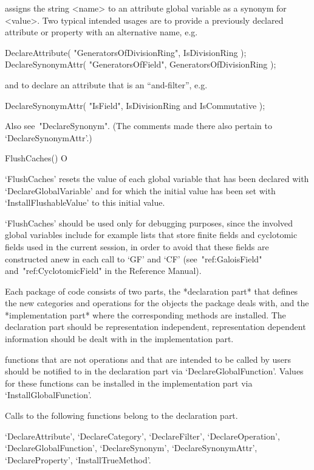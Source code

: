 assigns the string <name> to an attribute global variable as a synonym for
<value>.  Two typical intended usages are to provide a previously declared
attribute or property with an alternative name, e.g.

\begintt
DeclareAttribute( "GeneratorsOfDivisionRing", IsDivisionRing );
DeclareSynonymAttr( "GeneratorsOfField", GeneratorsOfDivisionRing );
\endtt

and to declare an attribute that is an ``and-filter'', e.g.

\begintt
DeclareSynonymAttr( "IsField", IsDivisionRing and IsCommutative );
\endtt

Also see~"DeclareSynonym". (The comments made there also pertain to
`DeclareSynonymAttr'.)

\>FlushCaches() O

`FlushCaches' resets the value of each global variable that has
been declared with `DeclareGlobalVariable' and for which the initial
value has been set with `InstallFlushableValue' to this initial value.

`FlushCaches' should be used only for debugging purposes,
since the involved global variables include for example lists that store
finite fields and cyclotomic fields used in the current {\GAP} session,
in order to avoid that these fields are constructed anew in each call
to `GF' and `CF' (see~"ref:GaloisField" and~"ref:CyclotomicField"
in the Reference Manual).



Each package of {\GAP} code consists of two parts,
the *declaration part* that defines the new categories and operations for
the objects the package deals with,
and the *implementation part* where the corresponding methods are
installed.
The declaration part should be representation independent,
representation dependent information should be dealt with in the
implementation part.

{\GAP} functions that are not operations and that are intended to be
called by users should be notified to {\GAP} in the declaration part via
`DeclareGlobalFunction'.
Values for these functions can be installed in the implementation part
via `InstallGlobalFunction'.

Calls to the following functions belong to the declaration part.

`DeclareAttribute',
`DeclareCategory',
`DeclareFilter',
`DeclareOperation',
`DeclareGlobalFunction',
`DeclareSynonym',
`DeclareSynonymAttr',
`DeclareProperty',
`InstallTrueMethod'.

